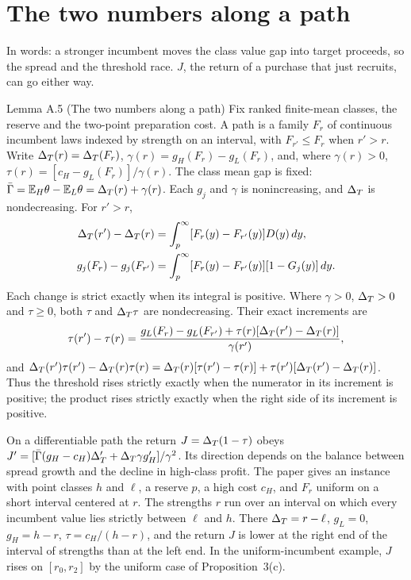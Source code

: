 \section{The two numbers along a path}\label{sec:trading-path}

In words: a stronger incumbent moves the class value gap into target proceeds, so the spread and the threshold
race. \(J\), the return of a purchase that just recruits, can go either way.

\begin{paperresult}{Lemma A.5 (The two numbers along a path)}
Fix ranked finite-mean classes, the reserve and the two-point preparation cost. A path is a family \(F_r\) of
continuous incumbent laws indexed by strength on an interval, with \(F_{r'}\le F_r\) when \(r'>r\). Write
\(\Delta_T(r)=\Delta_T(F_r)\), \(\gamma(r)=g_H(F_r)-g_L(F_r)\), and, where \(\gamma(r)>0\),
\(\tau(r)=[c_H-g_L(F_r)]/\gamma(r)\). The class mean gap is fixed:
\(\bar\Gamma=\mathbb{E}_H\theta-\mathbb{E}_L\theta=\Delta_T(r)+\gamma(r)\).
Each \(g_j\) and \(\gamma\) is nonincreasing, and \(\Delta_T\) is nondecreasing. For \(r'>r\),
\[
\begin{aligned}
\Delta_T(r')-\Delta_T(r)&=\int_p^\infty[F_r(y)-F_{r'}(y)]D(y)\,dy,\\
g_j(F_r)-g_j(F_{r'})&=\int_p^\infty[F_r(y)-F_{r'}(y)][1-G_j(y)]\,dy.
\end{aligned}
\]
Each change is strict exactly when its integral is positive. Where \(\gamma>0\), \(\Delta_T>0\) and \(\tau\ge0\), both
\(\tau\) and \(\Delta_T\tau\) are nondecreasing. Their exact increments are
\[
\tau(r')-\tau(r)=\frac{g_L(F_r)-g_L(F_{r'})+\tau(r)[\Delta_T(r')-\Delta_T(r)]}{\gamma(r')},
\]
and \(\Delta_T(r')\tau(r')-\Delta_T(r)\tau(r)=\Delta_T(r)[\tau(r')-\tau(r)]+\tau(r')[\Delta_T(r')-\Delta_T(r)]\).
Thus the threshold rises strictly exactly when the numerator in its increment is positive; the product rises
strictly exactly when the right side of its increment is positive.

On a differentiable path the return \(J=\Delta_T(1-\tau)\) obeys
\(J'=[\bar\Gamma(g_H-c_H)\Delta_T'+\Delta_T\gamma g_H']/\gamma^2\).
Its direction depends on the balance between spread growth and the decline in high-class profit. The paper gives an
instance with point classes \(h\) and \(\ell\), a reserve \(p\), a high cost \(c_H\), and \(F_r\) uniform on a short
interval centered at \(r\). The strengths \(r\) run over an interval on which every incumbent value lies strictly
between \(\ell\) and \(h\). There
\(\Delta_T=r-\ell\), \(g_L=0\), \(g_H=h-r\), \(\tau=c_H/(h-r)\),
and the return \(J\) is lower at the right end of the interval of strengths than at the left end. In the
uniform-incumbent example, \(J\) rises on \([r_0,r_2]\) by the uniform case of Proposition~3(c).
\end{paperresult}

